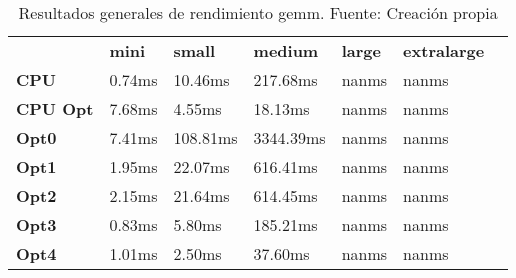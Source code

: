 \begin{table}[H]
    \centering
    \begin{tabular}{lllllll}
    \rowcolor[HTML]{DAE8FC} \ &  \textbf{mini} &  \textbf{small} &  \textbf{medium} &  \textbf{	large} &  \textbf{	extralarge} \\
    \cellcolor[HTML]{DAE8FC} \textbf{CPU} & 0.74ms & 10.46ms & 217.68ms & 	nanms & 	nanms \\
    \rowcolor[HTML]{EFEFEF} \cellcolor[HTML]{DAE8FC} \textbf{CPU Opt} & 7.68ms & 4.55ms & 18.13ms & 	nanms & 	nanms \\
    \cellcolor[HTML]{DAE8FC} \textbf{Opt0} & 7.41ms & 108.81ms & 3344.39ms & 	nanms & 	nanms \\
    \rowcolor[HTML]{EFEFEF} \cellcolor[HTML]{DAE8FC} \textbf{Opt1} & 1.95ms & 22.07ms & 616.41ms & 	nanms & 	nanms \\
    \cellcolor[HTML]{DAE8FC} \textbf{Opt2} & 2.15ms & 21.64ms & 614.45ms & 	nanms & 	nanms \\
    \rowcolor[HTML]{EFEFEF} \cellcolor[HTML]{DAE8FC} \textbf{Opt3} & 0.83ms & 5.80ms & 185.21ms & 	nanms & 	nanms \\
    \cellcolor[HTML]{DAE8FC} \textbf{Opt4} & 1.01ms & 2.50ms & 37.60ms & 	nanms & 	nanms \\
    \end{tabular}
    \caption[Resultados generales de rendimiento gemm]{{Resultados generales de rendimiento gemm. Fuente: Creación propia}}
    \label{table_global_gemm_PerformanceResults_data}
\end{table}